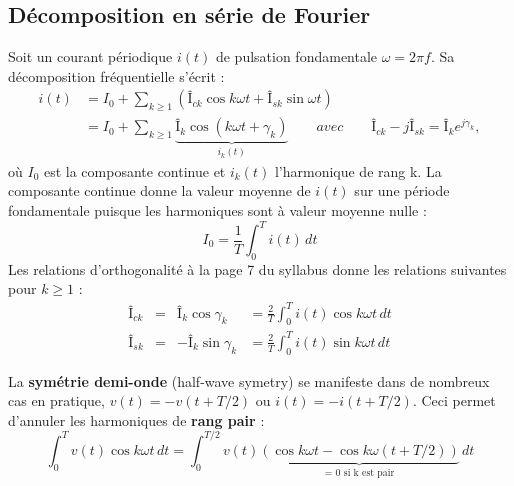 	\subsection{Décomposition en série de Fourier}
	Soit un courant périodique $i(t)$ de pulsation fondamentale $\omega = 2\pi f$. Sa décomposition fréquentielle s'écrit : 
	\begin{equation}
	\begin{aligned}
		i(t) &= I_0 + \sum _{k\geq 1} \left(Î_{ck} \cos k\omega t + Î_{sk} \sin \omega t\right)\\
			&= I_0 + \sum _{k\geq 1} \underbrace{Î_k \cos (k\omega t +\gamma _k)}_{i_k(t)} \qquad avec \qquad Î_{ck} - jÎ_{sk} = Î_k e^{j\gamma _k},
	\end{aligned}
	\end{equation}
	où $I_0$ est la composante continue et $i_k(t)$ l'harmonique de rang k. La composante continue donne la valeur moyenne de $i(t)$ sur une période fondamentale puisque les harmoniques sont à valeur moyenne nulle : 
	\begin{equation}
		I_0 = \frac{1}{T}\int _0 ^T i(t)\, dt
	\end{equation}
	Les relations d'orthogonalité à la page 7 du syllabus donne les relations suivantes pour $k\geq 1$ : 
	\begin{equation}
	\begin{aligned}
		Î_{ck} &= &Î_k \cos \gamma _k &= \frac{2}{T} \int _0 ^T i(t) \cos k\omega t\, dt\\
		Î_{sk} &= &-Î_k \sin \gamma _k &= \frac{2}{T} \int _0 ^T i(t) \sin k\omega t\, dt
	\end{aligned}
	\end{equation}
	
	La \textbf{symétrie demi-onde} (half-wave symetry) se manifeste dans de nombreux cas en pratique, $v(t) = -v(t+T/2)$ ou $i(t) = -i(t+T/2)$. Ceci permet d'annuler les harmoniques de \textbf{rang pair} : 
	\begin{equation}
		\int _0 ^T v(t)\cos k \omega t \, dt = \int _0 ^{T/2} v(t) \underbrace{\left(\cos k\omega t - \cos k\omega(t+T/2)\right)}_{\mbox{= 0 si k est pair}}\, dt
	\end{equation}
	
